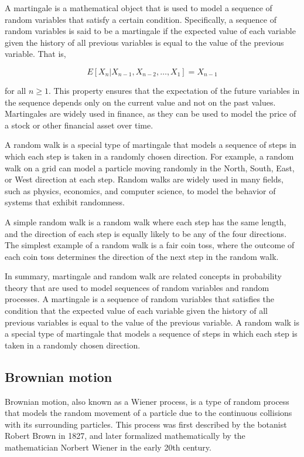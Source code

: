 \documentclass[12pt, a4paper, oneside]{article}
\begin{document}
A martingale is a mathematical object that is used to model a sequence of random variables that satisfy a certain condition. Specifically, a sequence of random variables is said to be a martingale if the expected value of each variable given the history of all previous variables is equal to the value of the previous variable. That is,

$$ E[X_n | X_{n-1}, X_{n-2}, \dots, X_1] = X_{n-1} $$

for all $n \ge 1$. This property ensures that the expectation of the future variables in the sequence depends only on the current value and not on the past values. Martingales are widely used in finance, as they can be used to model the price of a stock or other financial asset over time.

A random walk is a special type of martingale that models a sequence of steps in which each step is taken in a randomly chosen direction. For example, a random walk on a grid can model a particle moving randomly in the North, South, East, or West direction at each step. Random walks are widely used in many fields, such as physics, economics, and computer science, to model the behavior of systems that exhibit randomness.

A simple random walk is a random walk where each step has the same length, and the direction of each step is equally likely to be any of the four directions. The simplest example of a random walk is a fair coin toss, where the outcome of each coin toss determines the direction of the next step in the random walk.

In summary, martingale and random walk are related concepts in probability theory that are used to model sequences of random variables and random processes. A martingale is a sequence of random variables that satisfies the condition that the expected value of each variable given the history of all previous variables is equal to the value of the previous variable. A random walk is a special type of martingale that models a sequence of steps in which each step is taken in a randomly chosen direction.




\subsection{ Brownian motion }
Brownian motion, also known as a Wiener process, is a type of random process that models the random movement of a particle due to the continuous collisions with its surrounding particles. This process was first described by the botanist Robert Brown in 1827, and later formalized mathematically by the mathematician Norbert Wiener in the early 20th century.
\end{document}
